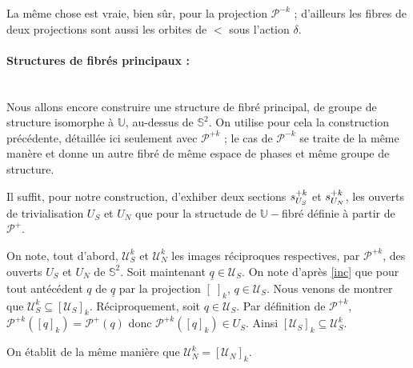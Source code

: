 \par
La m\^eme chose est vraie, bien s\^ur, pour la projection $\mathcal{P}^{-k}$ ; d'ailleurs les fibres de deux projections sont aussi les orbites de $\lt$ sous l'action $\delta$.

\paragraph{Structures de fibr\'es principaux :}~\\

Nous allons encore construire une structure de fibr\'e principal, de groupe de structure isomorphe \`a $\mathbb{U}$, au-dessus de $\mathbb{S}^2$. %
On utilise pour cela la construction pr\'ec\'edente, d\'etaill\'ee ici seulement avec $\mathcal{P}^{+k}$ ; %
le cas de $\mathcal{P}^{-k}$ se traite de la m\^eme man\`ere et donne un autre fibr\'e de m\^eme espace de phases et m\^eme groupe de structure.

\par
Il suffit, pour notre construction, d'exhiber deux sections $s_{U_{S}}^{+k}$ et $s_{U_{N}}^{+k}$, %
les ouverts de trivialisation $U_S$ et $U_N$ que pour la structude de $\mathbb{U}-$fibr\'e d\'efinie \`a partir de $\mathcal{P}^+$.

\par
On note, tout d'abord, $\mathcal{U}_S^k$ et $\mathcal{U}_N^k$ les images r\'eciproques respectives, par $\mathcal{P}^{+k}$, des ouverts $U_S$ et $U_N$ de $\mathbb {S}^2$. %
Soit maintenant $\underline{q}\in\mathcal{U}_S$. On note d'apr\`es \ref{inc} que pour tout ant\'ec\'edent $q$ de $\underline{q}$ par la projection $[\; ]_k$, %
$q\in\mathcal{U}_S$. Nous venons de montrer que $\mathcal{U}_S^k\subseteq [\mathcal{U}_S]_k$. R\'eciproquement, soit $q\in\mathcal{U}_S$. %
Par d\'efinition de $\mathcal{P}^{+k}$, $\mathcal{P}^{+k}([q]_k)=\mathcal{P}^+(q)$ donc $\mathcal{P}^{+k}([q]_k)\in U_S$. Ainsi $[\mathcal{U}_S]_k\subseteq\mathcal{U}_S^k$.

\par
On \'etablit de la m\^eme mani\`ere que $\mathcal{U}_N^k=[\mathcal{U}_N]_k$.

